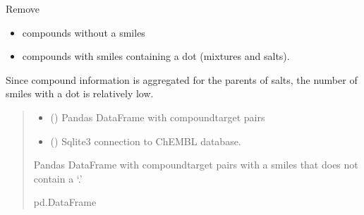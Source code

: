 \documentclass[letterpaper,10pt,english]{sphinxmanual}
\begin{document}
\begin{fulllineitems}
\label{\detokenize{clean_dataset:clean_dataset.remove_compounds_without_smiles_and_mixtures}}
\pysigstartsignatures
{}
\pysigstopsignatures
\sphinxAtStartPar
Remove
\begin{itemize}
\item {} 
\sphinxAtStartPar
compounds without a smiles

\item {} 
\sphinxAtStartPar
compounds with smiles containing a dot (mixtures and salts).

\end{itemize}

\sphinxAtStartPar
Since compound information is aggregated for the parents of salts,
the number of smiles with a dot is relatively low.
\begin{quote}\begin{description}
\begin{itemize}
\item {} 
\sphinxAtStartPar
{} () \textendash{} Pandas DataFrame with compound\sphinxhyphen{}target pairs

\item {} 
\sphinxAtStartPar
{} () \textendash{} Sqlite3 connection to ChEMBL database.

\end{itemize}

\sphinxAtStartPar
Pandas DataFrame with compound\sphinxhyphen{}target pairs with a smiles that does not contain a ‘.’

\sphinxAtStartPar
pd.DataFrame

\end{description}\end{quote}

\end{fulllineitems}
\end{document}
